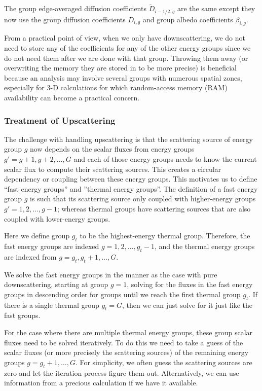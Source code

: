 The group edge-averaged diffusion coefficients $\widetilde{D}_{i-1/2,g}$ are the same except they now use the group diffusion coefficients $D_{i,g}$ and group albedo coefficients $\beta_{i,g}$.

From a practical point of view, when we only have downscattering, we do not need to store any of the coefficients for any of the other energy groups since we do not need them after we are done with that group. Throwing them away (or overwriting the memory they are stored in to be more precise) is beneficial because an analysis may involve several groups with numerous spatial zones, especially for 3-D calculations for which random-access memory (RAM) availability can become a practical concern. 

\subsubsection{Treatment of Upscattering}

The challenge with handling upscattering is that the scattering source of energy group $g$ now depends on the scalar fluxes from energy groups $g' = g+1, g+2, \ldots, G$ and each of those energy groups needs to know the current scalar flux to compute their scattering sources. This creates a circular dependency or coupling between these energy groups. This motivates us to define ``fast energy groups'' and ''thermal energy groups''. The definition of a fast energy group $g$ is such that its scattering source only coupled with higher-energy groups $g' = 1, 2, \ldots, g-1$; whereas thermal groups have scattering sources that are also coupled with lower-energy groups. 

Here we define group $g_t$ to be the highest-energy thermal group. Therefore, the fast energy groups are indexed $g = 1, 2, \ldots, g_t-1$, and the thermal energy groups are indexed from $g = g_t, g_t + 1, \ldots, G$.

We solve the fast energy groups in the manner as the case with pure downscattering, starting at group $g = 1$, solving for the fluxes in the fast energy groups in descending order for groups until we reach the first thermal group $g_t$. If there is a single thermal group $g_t = G$, then we can just solve for it just like the fast groups. 

For the case where there are multiple thermal energy groups, these group scalar fluxes need to be solved iteratively. To do this we need to take a guess of the scalar fluxes (or more precisely the scattering sources) of the remaining energy groups $g = g_t + 1, \ldots, G$. For simplicity, we often guess the scattering sources are zero and let the iteration process figure them out. Alternatively, we can use information from a precious calculation if we have it available.

